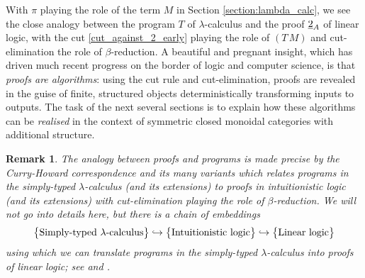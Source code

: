 \documentclass[english,letter paper,12pt,reqno]{article}
\theoremstyle{example}
\newtheorem{remark}[theorem]{Remark}
\def\inta{\bold{int}}
\begin{document}
With $\pi$ playing the role of the term $M$ in Section \ref{section:lambda_calc}, we see the close analogy between the program $T$ of $\lambda$-calculus and the proof $\underline{2}_A$ of linear logic, with the cut \eqref{cut_against_2_early} playing the role of $(T \, M)$ and cut-elimination the role of $\beta$-reduction. A beautiful and pregnant insight, which has driven much recent progress on the border of logic and computer science, is that \emph{proofs are algorithms}: using the cut rule and cut-elimination, proofs are revealed in the guise of finite, structured objects deterministically transforming inputs to outputs.
The task of the next several sections is to explain how these algorithms can be \emph{realised} in the context of symmetric closed monoidal categories with additional structure.

\begin{remark} The analogy between proofs and programs is made precise by the \emph{Curry-Howard correspondence} and its many variants \cite[\S 6.5]{selinger} which relates programs in the simply-typed $\lambda$-calculus (and its extensions) to proofs in intuitionistic logic (and its extensions) with cut-elimination playing the role of $\beta$-reduction. We will not go into details here, but there is a chain of embeddings
\[
\big\{\textup{Simply-typed $\lambda$-calculus}\big\} \hookrightarrow \big\{\textup{Intuitionistic logic}\big\} \hookrightarrow \big\{\textup{Linear logic}\big\}
\]
using which we can translate programs in the simply-typed $\lambda$-calculus into proofs of linear logic; see \cite[\S 5.1, \S 5.3]{girard_llogic} and \cite{lafont,abramsky,benton_etal}.
\end{remark}

\end{document}
